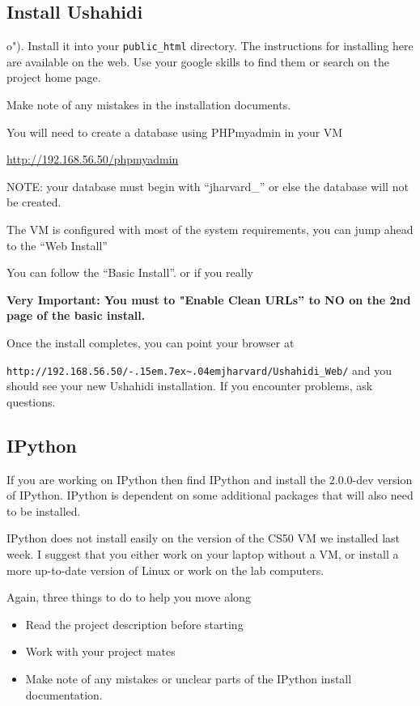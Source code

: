 \documentclass[letterpaper]{article}
\def\urltilde{\kern -.15em\lower .7ex\hbox{\~{}}\kern .04em}
\begin{document}
\subsection*{Install Ushahidi}
o").  Install it
into your {\tt public\_html} directory.  The instructions for installing here
are available on the web.  Use your google skills to find them or search on the project home page.

Make note of any mistakes in the installation documents.  

You will need to create a database using PHPmyadmin in your VM

\url{http://192.168.56.50/phpmyadmin}

NOTE: your database must begin with ``jharvard\_'' or else the database will not
be created.

The VM is configured with most of the system requirements, you can jump ahead
to the ``Web Install''

You can follow the ``Basic Install''.  or if you really 

{\bf Very Important: You must to "Enable Clean URLs'' to NO on the 2nd page
of the basic install.}

Once the install completes, you can point your browser at

{\tt http://192.168.56.50/\urltilde jharvard/Ushahidi\_Web/} and you should see
your new Ushahidi installation.  If you encounter problems, ask questions. 

\subsection*{IPython}

If you are working on IPython then find IPython and install the 2.0.0-dev
version of IPython.  IPython is dependent on some additional packages that
will also need to be installed.

IPython does not install easily on the version of the CS50 VM we installed
last week.  I suggest that you either work on your laptop without a VM, or
install a more up-to-date version of Linux or work on the lab computers.  

Again, three things to do to help you move along

\begin{itemize}
\item Read the project description before starting
\item Work with your project mates
\item Make note of any mistakes or unclear parts of the IPython install documentation.
\end{itemize}

\end{document}
